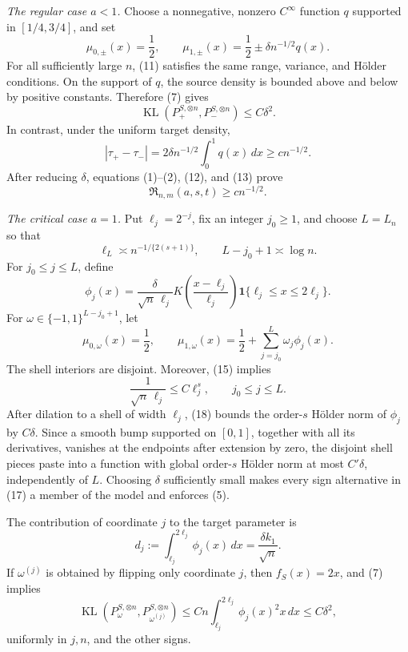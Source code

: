 \emph{The regular case \(a<1\).}
Choose a nonnegative, nonzero \(C^\infty\) function \(q\) supported in \([1/4,3/4]\), and set
\[
 \mu_{0,\pm}(x)=\frac12,
 \qquad
 \mu_{1,\pm}(x)=\frac12\pm\delta n^{-1/2}q(x).
\tag{11}
\]
For all sufficiently large \(n\), (11) satisfies the same range, variance, and H\"older conditions. On the support of \(q\), the source density is bounded above and below by positive constants. Therefore (7) gives
\[
 \operatorname{KL}(P_+^{S,\otimes n},P_-^{S,\otimes n})
 \le C\delta^2.
\tag{12}
\]
In contrast, under the uniform target density,
\[
 |\tau_+-\tau_-|
 =2\delta n^{-1/2}\int_0^1q(x)\,dx
 \ge c n^{-1/2}.
\tag{13}
\]
After reducing \(\delta\), equations (1)--(2), (12), and (13) prove
\[
 \mathfrak R_{n,m}(a,s,t)\ge c n^{-1/2}.
\tag{14}
\]

\emph{The critical case \(a=1\).}
Put \(\ell_j=2^{-j}\), fix an integer \(j_0\ge1\), and choose \(L=L_n\) so that
\[
 \ell_L\asymp n^{-1/\{2(s+1)\}},
 \qquad
 L-j_0+1\asymp\log n.
\tag{15}
\]
For \(j_0\le j\le L\), define
\[
 \phi_j(x)=\frac{\delta}{\sqrt n\,\ell_j}
 K\!\left(\frac{x-\ell_j}{\ell_j}\right)
 \mathbf 1\{\ell_j\le x\le2\ell_j\}.
\tag{16}
\]
For \(\omega\in\{-1,1\}^{L-j_0+1}\), let
\[
 \mu_{0,\omega}(x)=\frac12,
 \qquad
 \mu_{1,\omega}(x)=\frac12+
 \sum_{j=j_0}^L\omega_j\phi_j(x).
\tag{17}
\]
The shell interiors are disjoint. Moreover, (15) implies
\[
 \frac1{\sqrt n\,\ell_j}
 \le C\ell_j^s,
 \qquad j_0\le j\le L.
\tag{18}
\]
After dilation to a shell of width \(\ell_j\), (18) bounds the order-\(s\) H\"older norm of \(\phi_j\) by \(C\delta\). Since a smooth bump supported on \([0,1]\), together with all its derivatives, vanishes at the endpoints after extension by zero, the disjoint shell pieces paste into a function with global order-\(s\) H\"older norm at most \(C'\delta\), independently of \(L\). Choosing \(\delta\) sufficiently small makes every sign alternative in (17) a member of the model and enforces (5).

The contribution of coordinate \(j\) to the target parameter is
\[
 d_j:=\int_{\ell_j}^{2\ell_j}\phi_j(x)\,dx
 =\frac{\delta k_1}{\sqrt n}.
\tag{19}
\]
If \(\omega^{(j)}\) is obtained by flipping only coordinate \(j\), then \(f_S(x)=2x\), and (7) implies
\[
 \operatorname{KL}(P_\omega^{S,\otimes n},
                    P_{\omega^{(j)}}^{S,\otimes n})
 \le Cn\int_{\ell_j}^{2\ell_j}\phi_j(x)^2x\,dx
 \le C\delta^2,
\tag{20}
\]
uniformly in \(j,n\), and the other signs.

